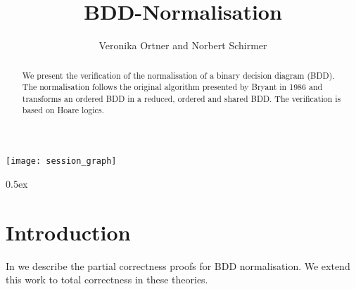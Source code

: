 \documentclass[11pt,a4paper]{article}
\begin{document}
\title{BDD-Normalisation}
\author{Veronika Ortner and Norbert Schirmer}
\begin{abstract}
We present the verification of the normalisation of a binary decision
diagram (BDD). The normalisation follows the original algorithm
presented by Bryant in 1986 and transforms an ordered BDD in a
reduced, ordered and shared BDD. The verification is based on Hoare
logics.
\end{abstract}
\maketitle

\tableofcontents
\begin{center}
  \texttt{[image: session\_graph]}
\end{center}
\parindent 0pt\parskip 0.5ex

\section{Introduction}

In \cite{Ortner-Schirmer-TPHOL05} we describe the partial correctness proofs for
BDD normalisation. We extend this work to total correctness in these theories.






\end{document}
